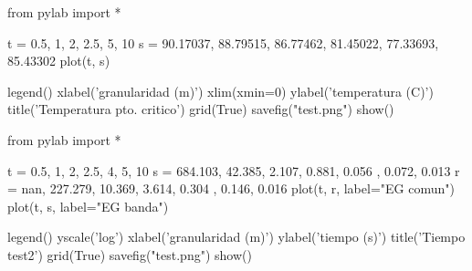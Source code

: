 from pylab import *

t = 0.5, 1, 2, 2.5, 5, 10
s = 90.17037, 88.79515, 86.77462, 81.45022, 77.33693, 85.43302
plot(t, s)

legend()
xlabel('granularidad (m)')
xlim(xmin=0)
ylabel('temperatura (C)')
title('Temperatura pto. critico')
grid(True)
savefig("test.png")
show()

from pylab import *

t = 0.5, 1, 2, 2.5, 4, 5, 10
s = 684.103, 42.385, 2.107, 0.881, 0.056 , 0.072, 0.013
r = nan, 227.279, 10.369, 3.614, 0.304 , 0.146, 0.016
plot(t, r, label="EG comun")
plot(t, s, label="EG banda")

legend()
yscale('log')
xlabel('granularidad (m)')
ylabel('tiempo (s)')
title('Tiempo test2')
grid(True)
savefig("test.png")
show()



